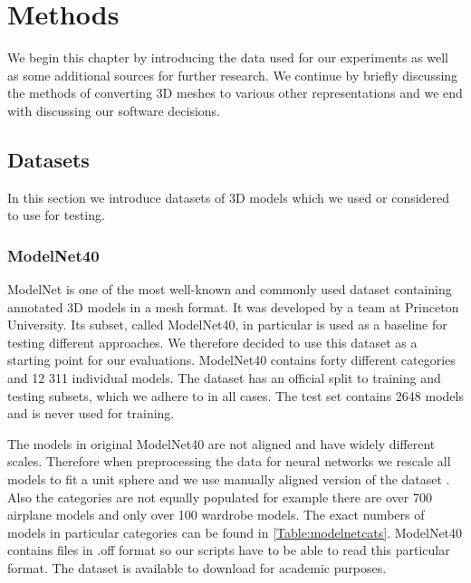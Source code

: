 \chapter{Methods}
\label{sec:chap4}
We begin this chapter by introducing the data used for our experiments as well as some additional sources for further research. We continue by briefly discussing the methods of converting 3D meshes to various other representations and we end with discussing our software decisions.

\section{Datasets}
\label{sec:dataset}
In this section we introduce datasets of 3D models which we used or considered to use for testing.

\subsection{ModelNet40}
ModelNet \cite{wu_3d_2014} is one of the most well-known and commonly used dataset containing annotated 3D models in a mesh format. It was developed by a team at Princeton University. Its subset, called ModelNet40, in particular is used as a baseline for testing different approaches. We therefore decided to use this dataset as a starting point for our evaluations. ModelNet40 contains forty different categories and 12 311 individual models. The dataset has an official split to training and testing subsets, which we adhere to in all cases. The test set contains 2648 models and is never used for training. \par



The models in original ModelNet40 are not aligned and have widely different scales. Therefore when preprocessing the data for neural networks we rescale all models to fit a  unit sphere and we use manually aligned version of the dataset \cite{sedaghat_orientation-boosted_2016}. Also the categories are not equally populated for example there are over 700 airplane models and only over 100 wardrobe models. The exact numbers of models in particular categories can be found in \autoref{Table:modelnetcats}. ModelNet40 contains files in .off format so our scripts have to be able to read this particular format. The dataset is available to download for academic purposes.




